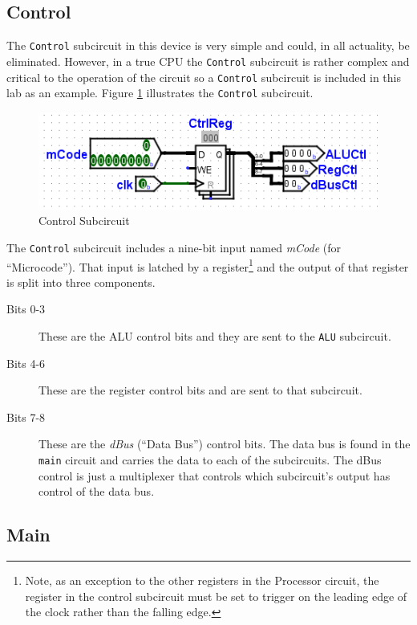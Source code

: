 \subsection{Control}

The \lstinline[columns=fixed]|Control| subcircuit in this device is very simple and could, in all actuality, be eliminated. However, in a true \ac{CPU} the \lstinline[columns=fixed]|Control| subcircuit is rather complex and critical to the operation of the circuit so a \lstinline[columns=fixed]|Control| subcircuit is included in this lab as an example. Figure \ref{fig:11-05} illustrates the \lstinline[columns=fixed]|Control| subcircuit.

\begin{figure}[H]
	\centering
	\includegraphics[width=\maxwidth{.95\linewidth}]{gfx/11-05}
	\caption{Control Subcircuit}
	\label{fig:11-05}
\end{figure}

The \lstinline[columns=fixed]|Control| subcircuit includes a nine-bit input named \textit{mCode} (for ``Microcode''). That input is latched by a register\footnote{Note, as an exception to the other registers in the Processor circuit, the register in the control subcircuit must be set to trigger on the leading edge of the clock rather than the falling edge.} and the output of that register is split into three components.

\begin{description}
	\item[Bits 0-3] These are the \ac{ALU} control bits and they are sent to the \lstinline[columns=fixed]|ALU| subcircuit.
	\item[Bits 4-6] These are the register control bits and are sent to that subcircuit.
	\item[Bits 7-8] These are the \textit{dBus} (``Data Bus'') control bits. The data bus is found in the \lstinline[columns=fixed]|main| circuit and carries the data to each of the subcircuits. The dBus control is just a multiplexer that controls which subcircuit's output has control of the data bus.
\end{description}

\subsection{Main}

